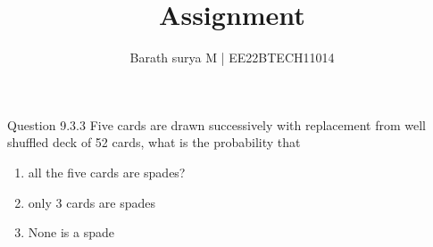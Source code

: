 \documentclass[journal,11pt,onecolumn]{IEEEtran}
\title{Assignment}
\author{Barath surya M | EE22BTECH11014}
\DeclareMathOperator*{\Res}{Res}
\providecommand{\pr}[1]{\ensuremath{\Pr\left(#1\right)}}
\providecommand{\qfunc}[1]{\ensuremath{Q\left(#1\right)}}
\providecommand{\sbrak}[1]{\ensuremath{{}\left[#1\right]}}
\providecommand{\lsbrak}[1]{\ensuremath{{}\left[#1\right.}}
\providecommand{\rsbrak}[1]{\ensuremath{{}\left.#1\right]}}
\providecommand{\brak}[1]{\ensuremath{\left(#1\right)}}
\providecommand{\lbrak}[1]{\ensuremath{\left(#1\right.}}
\providecommand{\rbrak}[1]{\ensuremath{\left.#1\right)}}
\providecommand{\cbrak}[1]{\ensuremath{\left\{#1\right\}}}
\providecommand{\lcbrak}[1]{\ensuremath{\left\{#1\right.}}
\providecommand{\rcbrak}[1]{\ensuremath{\left.#1\right\}}}
\providecommand{\abs}[1]{\left\vert#1\right\vert}
\providecommand{\res}[1]{\Res\displaylimits_{#1}}
\providecommand{\norm}[1]{\left\lVert#1\right\rVert}
\providecommand{\mtx}[1]{\mathbf{#1}}
\providecommand{\mean}[1]{E\left[ #1 \right]}
\providecommand{\fourier}{\overset{\mathcal{F}}{ \rightleftharpoons}}
\providecommand{\dec}[2]{\ensuremath{\overset{#1}{\underset{#2}{\gtrless}}}}
\providecommand{\pr}[1]{\ensuremath{\Pr\left(#1\right)}}
\providecommand{\qfunc}[1]{\ensuremath{Q\left(#1\right)}}
\providecommand{\qfunc}[1]{\ensuremath{Q\left(#1\right)}}
\begin{document}
\newtheorem{theorem}{Theorem}[section]
\newtheorem{problem}{Problem}
\newtheorem{proposition}{Proposition}[section]
\newtheorem{lemma}{Lemma}[section]
\newtheorem{corollary}[theorem]{Corollary}
\newtheorem{example}{Example}[section]
\newtheorem{definition}[problem]{Definition}
\newcommand{\BEQA}{\begin{eqnarray}}
\newcommand{\EEQA}{\end{eqnarray}}
\newcommand{\define}{\stackrel{\triangle}{=}}

\providecommand{\mbf}{\mathbf}
\providecommand{\pr}[1]{\ensuremath{\Pr\left(#1\right)}}
\providecommand{\qfunc}[1]{\ensuremath{Q\left(#1\right)}}
\providecommand{\sbrak}[1]{\ensuremath{{}\left[#1\right]}}
\providecommand{\lsbrak}[1]{\ensuremath{{}\left[#1\right.}}
\providecommand{\rsbrak}[1]{\ensuremath{{}\left.#1\right]}}
\providecommand{\brak}[1]{\ensuremath{\left(#1\right)}}
\providecommand{\lbrak}[1]{\ensuremath{\left(#1\right.}}
\providecommand{\rbrak}[1]{\ensuremath{\left.#1\right)}}
\providecommand{\cbrak}[1]{\ensuremath{\left\{#1\right\}}}
\providecommand{\lcbrak}[1]{\ensuremath{\left\{#1\right.}}
\providecommand{\rcbrak}[1]{\ensuremath{\left.#1\right\}}}
\theoremstyle{remark}
\newtheorem{rem}{Remark}
\providecommand{\abs}[1]{\left\vert#1\right\vert}
\providecommand{\res}[1]{\Res\displaylimits_{#1}} 
\providecommand{\norm}[1]{\left\lVert#1\right\rVert}
\providecommand{\mtx}[1]{\mathbf{#1}}
\providecommand{\mean}[1]{E\left[ #1 \right]}
\providecommand{\fourier}{\overset{\mathcal{F}}{ \rightleftharpoons}}
\providecommand{\system}[1]{\overset{\mathcal{#1}}{ \longleftrightarrow}}
\providecommand{\dec}[2]{\ensuremath{\overset{#1}{\underset{#2}{\gtrless}}}}
\let\vec\mathbf
\def\putbox#1#2#3{\makebox[0in][l]{\makebox[#1][l]{}\raisebox{\baselineskip}[0in][0in]{\raisebox{#2}[0in][0in]{#3}}}}
     \def\rightbox#1{\makebox[0in][r]{#1}}
     \def\centbox#1{\makebox[0in]{#1}}
     \def\topbox#1{\raisebox{-\baselineskip}[0in][0in]{#1}}
     \def\midbox#1{\raisebox{-0.5\baselineskip}[0in][0in]{#1}}
\maketitle
Question 9.3.3
Five cards are drawn successively with replacement from well shuffled deck of 52 cards, what is the probability that
\begin{enumerate}
	\item all the five cards are spades?
	\item only 3 cards are spades
	\item None is a spade
\end{enumerate}
\end{document}
